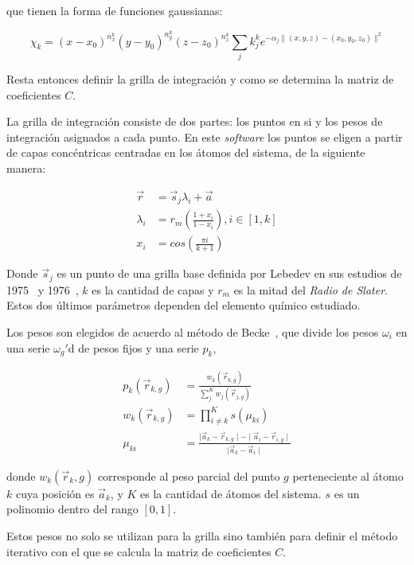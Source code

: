 que tienen la forma de funciones gaussianas:

\begin{equation}
    \chi_k = (x - x_0)^{n_x^k} (y - y_0)^{n_y^k} (z - z_0)^{n_z^k} \sum_j k_j^k e^{-\alpha_j \|(x,y,z) - (x_0,y_0,z_0) \|^2 }
\end{equation}

Resta entonces definir la grilla de integraci\'on y como se determina la matriz de coeficientes $C$. 

La grilla de integraci\'on consiste de dos partes: los puntos en si y los pesos de integraci\'on asignados a cada punto. En este
\textit{software} los puntos se eligen a partir de capas conc\'entricas centradas en los \'atomos del sistema, de la siguiente
manera:

\begin{align}
    \vec{r} & = \vec{s}_j \lambda_i + \vec{a} \\
    \lambda_i & = r_m \left ( \frac{1 + x_i}{1 - x_i} \right), i \in [1, k] \\
    x_i & = cos \left ( \frac{\pi i }{k + 1} \right )
\end{align}

Donde $\vec{s}_j$ es un punto de una grilla base definida por Lebedev en sus estudios de 1975~\cite{Lebedev1} y 1976~\cite{Lebedev2},
$k$ es la cantidad de capas y $r_m$ es la mitad del \textit{Radio de Slater}. Estos dos \'ultimos par\'ametros dependen del elemento qu\'imico
estudiado.

Los pesos son elegidos de acuerdo al m\'etodo de Becke~\cite{Becke}, que divide los
pesos $\omega_i$ en una serie $\omega_g'$d de pesos fijos y una serie $p_k$,

\begin{align}
    p_k(\vec{r}_{k,g}) & = \frac{w_k(\vec{r}_{k,g})}{\sum_j^K w_j(\vec{r}_{j,g})} \\
    w_k(\vec{r}_{k,g}) & = \prod_{i \neq k}^K s(\mu_{ki}) \\
    \mu_{ki} & = \frac{\mid \vec{a}_k - \vec{r}_{k,g} \mid - \mid \vec{a}_i - \vec{r}_{i,g} \mid }{ \mid \vec{a}_k - \vec{a}_i \mid }
\end{align}

donde $w_k(\vec{r}_k,g)$ corresponde al peso parcial del punto $g$ perteneciente al
\'atomo $k$ cuya posici\'on es $\vec{a}_k$, y $K$ es la cantidad de \'atomos del
sistema. $s$ es un polinomio dentro del rango $[0,1]$.

Estos pesos no solo se utilizan para la grilla sino tambi\'en para definir el m\'etodo
iterativo con el que se calcula la matriz de coeficientes $C$.

